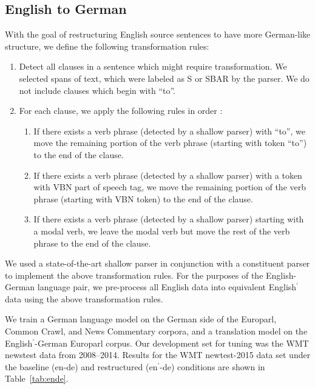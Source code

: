 
\subsection{English to German}

With the goal of restructuring English source sentences to have more German-like structure, we define the following transformation rules:

\begin{enumerate}
%
\item Detect all clauses in a sentence which might require transformation.
      We selected spans of text, which were labeled as S or SBAR by the parser.
      We do not include clauses which begin with ``to''.
%      
\item For each clause, we apply the following rules in order :
%
\begin{enumerate}
%
	\item If there exists a verb phrase (detected by a shallow parser) with ``to'', we move the remaining portion of the verb phrase (starting with token ``to'') to the end of the clause.
%
	\item If there exists a verb phrase (detected by a shallow parser) with a token with VBN part of speech tag, we move the remaining portion of the verb phrase (starting with VBN token) to the end of the clause.
%
	\item If there exists a verb phrase (detected by a shallow parser) starting with a modal verb, we leave the modal verb but move the rest of the verb phrase to the end of the clause.
%
\end{enumerate} 
%
\end{enumerate}
%
We used a state-of-the-art shallow parser \cite{PunyakanokRo01} in conjunction with a constituent parser \cite{socher-EtAl:2013:ACL2013} to implement the above transformation rules.
%
For the purposes of the English-German language pair, we pre-process all English data into equivalent English$^\prime$ data using the above transformation rules.

We train a German language model on the German side of the Europarl, Common Crawl, and News Commentary corpora, and a translation model on the English$^\prime$-German Europarl corpus.
%
Our development set for tuning was the WMT newstest data from 2008--2014.
%
Results for the WMT newtest-2015 data set under the baseline (en-de) and restructured (en$^\prime$-de) conditions are shown in Table~\ref{tab:ende}.

